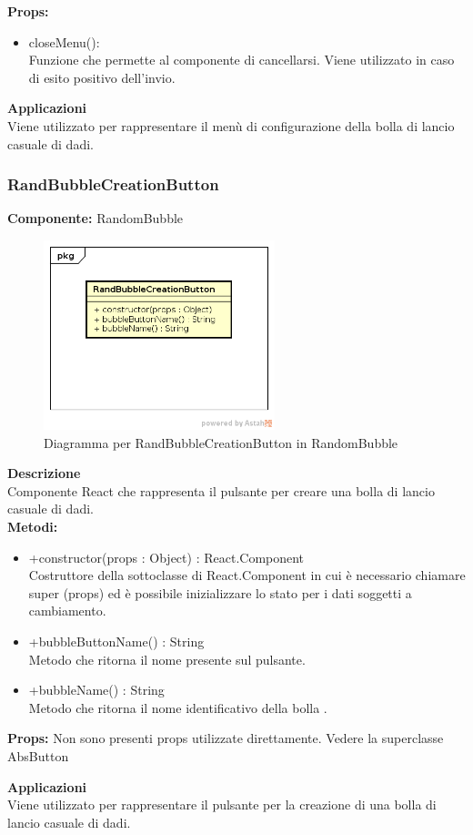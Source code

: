 \textbf{Props:} 
\begin{itemize}
\item closeMenu(): 
\\
Funzione che permette al componente di cancellarsi. Viene utilizzato in caso di esito positivo dell'invio.
\end{itemize} 


\textbf{Applicazioni}\\
Viene utilizzato per rappresentare il menù di configurazione della bolla di lancio casuale di dadi. 


\clearpage

\subsubsection{RandBubbleCreationButton}
\textbf{Componente:}  RandomBubble\\
   \FloatBarrier
   \begin{figure}[ht]
   \centering
   \includegraphics[width=0.6\textwidth]{img/single-RandBubbleCreationButton.png}
   \caption{{Diagramma per RandBubbleCreationButton in RandomBubble}}
\end{figure}
\FloatBarrier
\textbf{Descrizione}\\
Componente React che rappresenta il pulsante per creare una bolla di lancio casuale di dadi.
\\
\textbf{Metodi:} 
\begin{itemize}
\item +constructor(props : Object) : React.Component 
\\
Costruttore della sottoclasse di React.Component in cui è necessario chiamare super (props) ed è possibile inizializzare lo stato per i dati soggetti a cambiamento.

\item +bubbleButtonName() : String 
\\
Metodo che ritorna il nome presente sul pulsante.

\item +bubbleName() : String 
\\
Metodo che ritorna il nome identificativo della bolla .

\end{itemize}

\textbf{Props:} 
Non sono presenti props utilizzate direttamente. Vedere la superclasse AbsButton 


\textbf{Applicazioni}\\
Viene utilizzato per rappresentare il pulsante per la creazione di una bolla di lancio casuale di dadi. 


